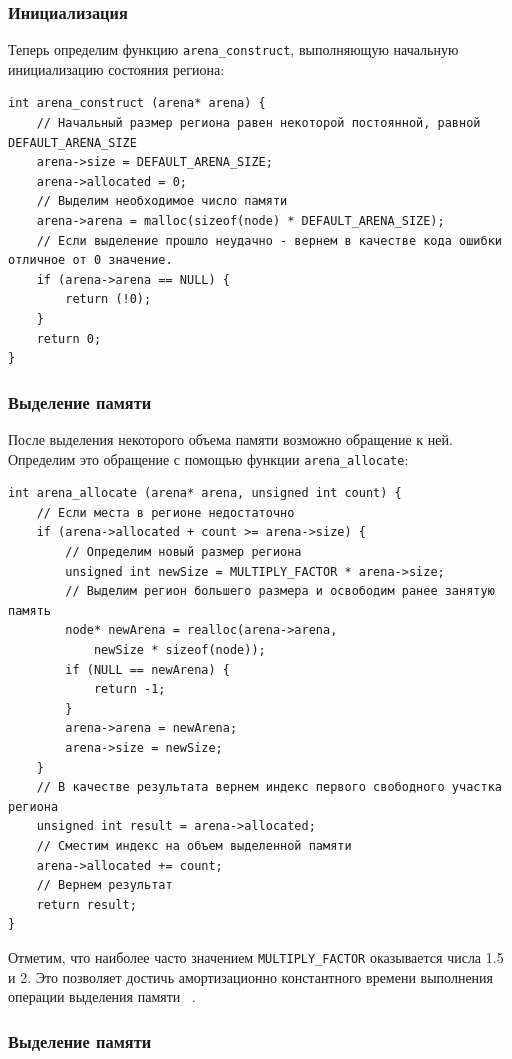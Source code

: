 \documentclass[bachelor, och, coursework]{SCWorks}
\begin{document}
\subsubsection{Инициализация}

Теперь определим функцию \verb"arena_construct", выполняющую начальную
инициализацию состояния региона:

\begin{verbatim}
int arena_construct (arena* arena) {
	// Начальный размер региона равен некоторой постоянной, равной DEFAULT_ARENA_SIZE
	arena->size = DEFAULT_ARENA_SIZE;
	arena->allocated = 0;
	// Выделим необходимое число памяти
	arena->arena = malloc(sizeof(node) * DEFAULT_ARENA_SIZE);
	// Если выделение прошло неудачно - вернем в качестве кода ошибки отличное от 0 значение.
	if (arena->arena == NULL) {
		return (!0);
	}
	return 0;
}
\end{verbatim}


\subsubsection{Выделение памяти}

После выделения некоторого объема памяти возможно обращение к ней.
Определим это обращение с помощью функции \verb"arena_allocate":

\begin{verbatim}
int arena_allocate (arena* arena, unsigned int count) {
	// Если места в регионе недостаточно
	if (arena->allocated + count >= arena->size) {
		// Определим новый размер региона
		unsigned int newSize = MULTIPLY_FACTOR * arena->size;
		// Выделим регион большего размера и освободим ранее занятую память
		node* newArena = realloc(arena->arena,
			newSize * sizeof(node));
		if (NULL == newArena) {
			return -1;
		}
		arena->arena = newArena;
		arena->size = newSize;
	}
	// В качестве результата вернем индекс первого свободного участка региона
	unsigned int result = arena->allocated;
	// Сместим индекс на объем выделенной памяти
	arena->allocated += count;
	// Вернем результат
	return result;
}
\end{verbatim}
Отметим, что наиболее часто значением \verb"MULTIPLY_FACTOR" оказывается 
числа 1.5 и 2. Это позволяет достичь амортизационно константного 
времени выполнения операции выделения памяти ~\cite{Facebook_source}.

\subsubsection{Выделение памяти}
\end{document}
